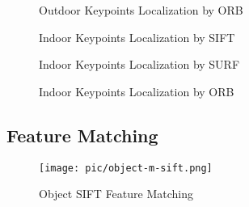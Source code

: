 \documentclass[paper=a4, fontsize=11pt]{scrartcl} %
\numberwithin{equation}{section} %
\numberwithin{figure}{section} %
\numberwithin{table}{section} %
\begin{document}
\begin{figure}[htbp]
\centering
{}
\hspace{1in}
\caption{Outdoor Keypoints Localization by ORB}
\label{fig:indoor1-orb} %
\end{figure}
 


\begin{figure}[htbp]
\centering
{}
\hspace{1in}
\caption{Indoor Keypoints Localization by SIFT}
\label{fig:outdoor1-sift} %
\end{figure}
 

\begin{figure}[htbp]
\centering
{}
\hspace{1in}
\caption{Indoor Keypoints Localization by SURF}
\label{fig:outdoor1-surf} %
\end{figure}
 

\begin{figure}[htbp]
\centering
{}
\hspace{1in}
\caption{Indoor Keypoints Localization by ORB}
\label{fig:outdoor1-orb} %
\end{figure}
 


\subsection{Feature Matching}

\begin{figure}[htbp]
\centering
\texttt{[image: pic/object-m-sift.png]}
\caption{Object SIFT Feature Matching}
\label{fig:object-m-sift}
\end{figure}
\end{document}
